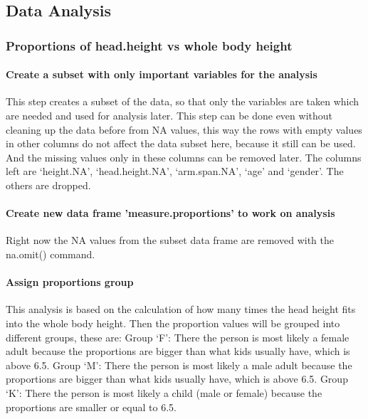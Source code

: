 \documentclass[]{article}
\begin{document}
\newpage

\subsection{Data Analysis}
\label{sec:appendix-data-analysis}

\subsubsection{Proportions of head.height vs whole body height}
\label{sec:appendix-height-vs-head.height}

\paragraph{Create a subset with only important variables for the analysis}
\label{sec:appendix-create-subset}

This step creates a subset of the data, so that only the variables are
taken which are needed and used for analysis later. This step can be
done even without cleaning up the data before from NA values, this way
the rows with empty values in other columns do not affect the data
subset here, because it still can be used. And the missing values only
in these columns can be removed later. The columns left are `height.NA',
`head.height.NA', `arm.span.NA', `age' and `gender'. The others are
dropped.

\paragraph{Create new data frame 'measure.proportions' to work on analysis}
\label{sec:appendix-create-data-frame-no-NA}

Right now the NA values from the subset data frame are removed with the
na.omit() command.

\paragraph{Assign proportions group}
\label{sec:appendix-assign-proportions-group}

This analysis is based on the calculation of how many times the head
height fits into the whole body height. Then the proportion values will
be grouped into different groups, these are: Group `F': There the person
is most likely a female adult because the proportions are bigger than
what kids usually have, which is above 6.5. Group `M': There the person
is most likely a male adult because the proportions are bigger than what
kids usually have, which is above 6.5. Group `K': There the person is
most likely a child (male or female) because the proportions are smaller
or equal to 6.5.
\end{document}
